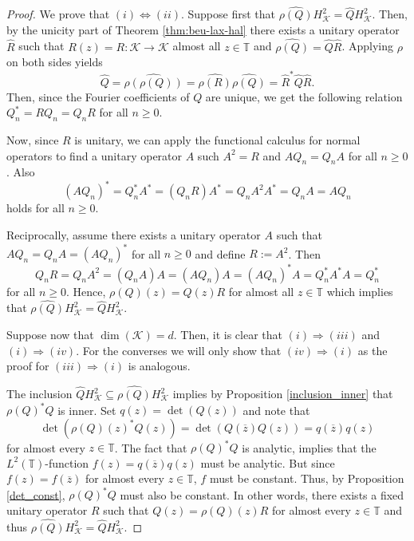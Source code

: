 \documentclass[a4paper,12pt]{amsart}
\def\KK{{\mathcal{K}}}
\def\T{{\mathbb{T}}}
\theoremstyle{definition}
\begin{document}
\begin{proof}
We prove that $(i)\Leftrightarrow(ii)$. Suppose first that $\widehat{\rho(Q)}H^2_\KK=\widehat{Q}H^2_\KK$. Then, by the unicity part of Theorem \ref{thm:beu-lax-hal} there exists a unitary operator $\widehat{R}$ such that $R(z)=R:\KK\to\KK$ almost all $z\in\T$ and $\widehat{\rho(Q)}=\widehat{Q}\widehat{R}$. Applying $\rho$ on both sides yields
\begin{equation*}
\widehat{Q}=\widehat{\rho(\rho(Q))}=\widehat{\rho(R)}\widehat{\rho(Q)}=\widehat{R}^*\widehat{Q}\widehat{R}.
\end{equation*}
Then, since the Fourier coefficients of $Q$ are unique, we get the following relation $Q_n^*=RQ_n=Q_nR$ for all $n\geqslant0$.

Now, since $R$ is unitary, we can apply the functional calculus for normal operators to find a unitary operator $A$ such $A^2=R$ and $AQ_n=Q_nA$ for all $n\geqslant0$. Also
\begin{equation*}
(AQ_n)^*=Q_n^*A^*=(Q_nR)A^*=Q_nA^2A^*=Q_nA=AQ_n
\end{equation*}
holds for all $n\geqslant0$.

Reciprocally, assume there exists a unitary operator $A$ such that $AQ_n=Q_nA=(AQ_n)^*$ for all $n\geqslant0$ and define $R:=A^2$. Then
\begin{equation*}
Q_nR=Q_nA^2=(Q_nA)A=(AQ_n)A=(AQ_n)^*A=Q_n^*A^*A=Q_n^*
\end{equation*}
for all $n\geqslant0$. Hence, $\rho(Q)(z)=Q(z)R$ for almost all $z\in\T$ which implies that $\widehat{\rho(Q)}H^2_\KK=\widehat{Q}H^2_\KK$.


Suppose now that $\dim(\KK) = d$. Then, it is clear that $(i)\Rightarrow(iii)$ and $(i)\Rightarrow(iv)$. For the converses we will only show that $(iv)\Rightarrow(i)$ as the proof for $(iii)\Rightarrow(i)$ is analogous. 

The inclusion $\widehat{Q}H^2_\KK\subseteq\widehat{\rho(Q)}H^2_\KK$ implies by Proposition \ref{inclusion_inner} that $\rho(Q)^*Q$ is inner. 
Set $q(z)=\det(Q(z))$ and note that
\begin{equation*}
\det(\rho(Q)(z)^*Q(z))=\det(Q(\overline{z})Q(z))=q(\overline{z})q(z)
\end{equation*}
for almost every $z\in\T$. The fact that $\rho(Q)^*Q$ is analytic, implies that the $L^2(\T)$-function $f(z)=q(\overline{z})q(z)$ must be analytic. But since $f(z)=f(\overline{z})$ for almost every $z\in\T$, $f$ must be constant. Thus, by Proposition \ref{det_const}, $\rho(Q)^*Q$ must also be constant. In other words, there exists a fixed unitary operator $R$ such that $Q(z)=\rho(Q)(z)R$ for almost every $z\in\T$ and thus $\widehat{\rho(Q)}H^2_\KK=\widehat{Q}H^2_\KK$.
\end{proof}
\end{document}
